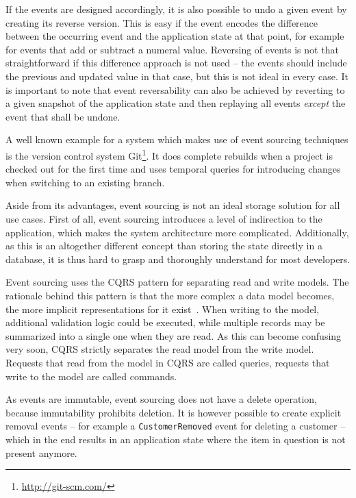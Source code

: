 If the events are designed accordingly, it is also possible to undo a given event by creating its reverse version.
This is easy if the event encodes the difference between the occurring event and the application state at that point, for example for events that add or subtract a numeral value.
Reversing of events is not that straightforward if this difference approach is not used -- the events should include the previous and updated value in that case, but this is not ideal in every case.
It is important to note that event reversability can also be achieved by reverting to a given snapshot of the application state and then replaying all events \emph{except} the event that shall be undone.

A well known example for a system which makes use of event sourcing techniques is the version control system Git\footnote{\url{http://git-scm.com/}}.
It does complete rebuilds when a project is checked out for the first time and uses temporal queries for introducing changes when switching to an existing branch.

Aside from its advantages, event sourcing is not an ideal storage solution for all use cases.
First of all, event sourcing introduces a level of indirection to the application, which makes the system architecture more complicated.
Additionally, as this is an altogether different concept than storing the state directly in a database, it is thus hard to grasp and thoroughly understand for most developers.

Event sourcing uses the \acf{CQRS} pattern for separating read and write models.
The rationale behind this pattern is that the more complex a data model becomes, the more implicit representations for it exist~\cite{WEB:Fowler:2011}.
When writing to the model, additional validation logic could be executed, while multiple records may be summarized into a single one when they are read.
As this can become confusing very soon, \ac{CQRS} strictly separates the read model from the write model.
Requests that read from the model in \ac{CQRS} are called queries, requests that write to the model are called commands.


As events are immutable, event sourcing does not have a delete operation, because immutability prohibits deletion.
It is however possible to create explicit removal events -- for example a \texttt{CustomerRemoved} event for deleting a customer -- which in the end results in an application state where the item in question is not present anymore.

